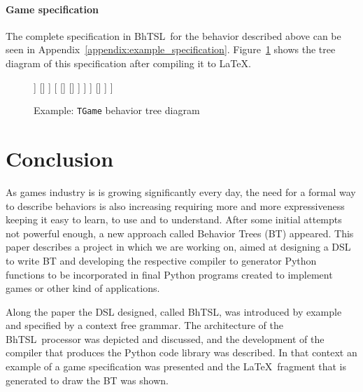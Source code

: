 \documentclass[a4paper,UKenglish,cleveref, autoref, thm-restate]{oasics-v2019}
\def\bht{BhTSL}
\begin{document}
\paragraph{Game specification}
The complete specification in \bht\ for the behavior described above can be seen in 
Appendix~\ref{appendix:example_specification}.
Figure~\ref{fig:example} shows the tree diagram of this specification after compiling it to \LaTeX.
\begin{figure}
    \centering
    \begin{behavior}
        [\rootnode
            [\selector
                [\memorysequence
                    [\condition{sees player}]
                    [\action{activate alarm}]
                    [\memoryprobselector
                        [\probnodesequence{$e1$}
                            [\inverter
                                [\condition{player dead}]
                            ]
                            []
                        ]
                        [
                            []
                            []
                        ]
                    ]
                ]
                []
            ]
        ]
    \end{behavior}
    \caption{Example: \texttt{TGame} behavior tree diagram}
    \label{fig:example}
\end{figure}

\section{Conclusion}
\label{sec:conclusion}

As games industry is is growing significantly every day,  the need for a formal way to describe behaviors  
is also increasing requiring more and more expressiveness keeping it easy to learn, to use and to understand.
After some initial attempts not powerful enough, a new approach called Behavior Trees (BT) appeared.
This paper describes a project in which we are working on, aimed at designing a DSL to write BT
and developing the respective compiler to generator Python functions to be incorporated in final Python
programs created to implement games or other kind of applications.

Along the paper the DSL designed, called \bht, was introduced by example and specified by a context 
free grammar. 
The architecture of the \bht\ processor was depicted and discussed, and the development of the compiler that produces the
Python code library  was described.
In that context an example of a game  specification was presented and the \LaTeX\ fragment that is
 generated to draw the BT was shown.
 
\end{document}
